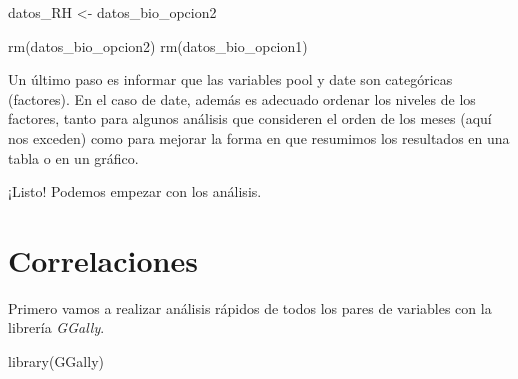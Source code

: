 \documentclass[
]{book}
\newenvironment{Shaded}{\begin{snugshade}}{\end{snugshade}}
\newcommand{\AttributeTok}[1]{\textcolor[rgb]{0.77,0.63,0.00}{#1}}
\newcommand{\CommentTok}[1]{\textcolor[rgb]{0.56,0.35,0.01}{\textit{#1}}}
\newcommand{\FunctionTok}[1]{\textcolor[rgb]{0.00,0.00,0.00}{#1}}
\newcommand{\NormalTok}[1]{#1}
\newcommand{\OtherTok}[1]{\textcolor[rgb]{0.56,0.35,0.01}{#1}}
\newcommand{\SpecialCharTok}[1]{\textcolor[rgb]{0.00,0.00,0.00}{#1}}
\newcommand{\StringTok}[1]{\textcolor[rgb]{0.31,0.60,0.02}{#1}}
\begin{document}
\begin{Shaded}
\begin{Highlighting}[]
\NormalTok{datos\_RH }\OtherTok{\textless{}{-}}\NormalTok{ datos\_bio\_opcion2}

\FunctionTok{rm}\NormalTok{(datos\_bio\_opcion2)}
\FunctionTok{rm}\NormalTok{(datos\_bio\_opcion1)}
\end{Highlighting}
\end{Shaded}

Un último paso es informar que las variables pool y date son categóricas (factores). En el caso de date, además es adecuado ordenar los niveles de los factores, tanto para algunos análisis que consideren el orden de los meses (aquí nos exceden) como para mejorar la forma en que resumimos los resultados en una tabla o en un gráfico.

\begin{Shaded}
\end{Shaded}

¡Listo! Podemos empezar con los análisis.

\hypertarget{correlaciones}{%
\section{Correlaciones}\label{correlaciones}}

Primero vamos a realizar análisis rápidos de todos los pares de variables con la librería \emph{GGally}.

\begin{Shaded}
\begin{Highlighting}[]
\FunctionTok{library}\NormalTok{(GGally)}
\end{Highlighting}
\end{Shaded}
\end{document}
